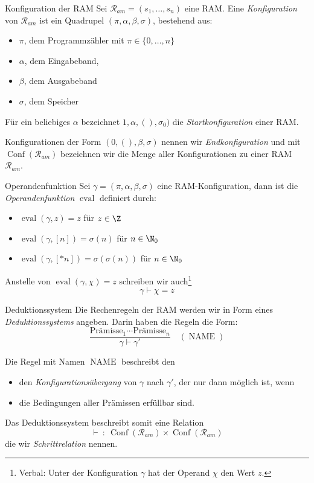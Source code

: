 \documentclass[german]{spicker}
\begin{document}
\begin{defi}{Konfiguration der RAM}
  Sei $\mathcal{R}_{am} = (s_1, \ldots, s_n)$ eine RAM.
  Eine \emph{Konfiguration} von $\mathcal{R}_{am}$ ist ein Quadrupel $(\pi, \alpha, \beta, \sigma)$, bestehend aus:
  \begin{itemize}
    \item $\pi$, dem Programmzähler mit $\pi \in \{0, \ldots, n\}$
    \item $\alpha$, dem Eingabeband,
    \item $\beta$, dem Ausgabeband
    \item $\sigma$, dem Speicher
  \end{itemize}

  Für ein beliebiges $\alpha$ bezeichnet $1, \alpha, (), \sigma_0)$ die \emph{Startkonfiguration} einer RAM.

  Konfigurationen der Form $(0, (), \beta, \sigma)$ nennen wir \emph{Endkonfiguration} und mit $\operatorname{Conf}(\mathcal{R}_{am})$ bezeichnen wir die Menge aller Konfigurationen zu einer RAM $\mathcal{R}_{am}$.
\end{defi}

\begin{defi}{Operandenfunktion}
  Sei $\gamma = (\pi, \alpha, \beta, \sigma)$ eine RAM-Konfiguration, dann ist die \emph{Operandenfunktion} $\operatorname{eval}$ definiert durch:
  \begin{itemize}
    \item $\operatorname{eval}(\gamma, z) = z$ für $z \in \Z$
    \item $\operatorname{eval}(\gamma, [n]) = \sigma(n)$ für $n\in \N_0$
    \item $\operatorname{eval}(\gamma, [*n]) = \sigma(\sigma(n))$ für $n \in \N_0$
  \end{itemize}

  Anstelle von $\operatorname{eval}(\gamma, \chi) = z$ schreiben wir auch\footnote{Verbal: Unter der Konfiguration $\gamma$ hat der Operand $\chi$ den Wert $z$.}
  $$
    \boxed{
      \gamma \vdash \chi = z
    }
  $$
\end{defi}

\begin{defi}{Deduktionssystem}
  Die Rechenregeln der RAM werden wir in Form eines \emph{Deduktionssystems} angeben.
  Darin haben die Regeln die Form:
  $$
    \boxed{
      \frac{\text{Prämisse}_1 \cdots \text{Prämisse}_n}{\gamma \vdash \gamma'} \quad (\operatorname{NAME})
    }
  $$

  Die Regel mit Namen $\operatorname{NAME}$ beschreibt den
  \begin{itemize}
    \item den \emph{Konfigurationsübergang} von $\gamma$ nach $\gamma'$, der nur dann möglich ist, wenn
    \item die Bedingungen aller Prämissen erfüllbar sind.
  \end{itemize}

  Das Deduktionssystem beschreibt somit eine Relation
  $$
    \vdash \ : \ \operatorname{Conf} (\mathcal{R}_{am}) \times \operatorname{Conf} (\mathcal{R}_{am})
  $$
  die wir \emph{Schrittrelation} nennen.
\end{defi}
\end{document}
